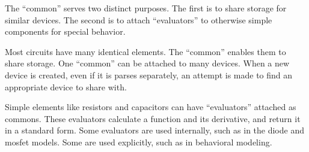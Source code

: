 The ``common'' serves two distinct purposes.  The first is to share
storage for similar devices.  The second is to attach ``evaluators''
to otherwise simple components for special behavior.

Most circuits have many identical elements.  The ``common'' enables
them to share storage.  One ``common'' can be attached to many
devices.  When a new device is created, even if it is parses
separately, an attempt is made to find an appropriate device to share
with.

Simple elements like resistors and capacitors can have ``evaluators''
attached as commons.  These evaluators calculate a function and its
derivative, and return it in a standard form.  Some evaluators are
used internally, such as in the diode and mosfet models.  Some are
used explicitly, such as in behavioral modeling.

